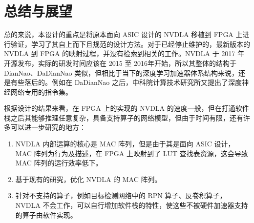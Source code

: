 \chapter{总结与展望}\label{chap:conclusion}

总的来说，本设计的重点是将原本面向 ASIC 设计的 NVDLA 移植到 FPGA 上进行验证，学习了其自上而下且规范的设计方法。对于已经停止维护的，最新版本的 NVDLA 到 FPGA 的映射过程，并没有检索到相关的工作。NVDLA 于 2017 年开源发布，实际的研发时间应该在 2015 至 2016年开始，所以其整体的结构于 DianNao、DaDianNao 类似，但相比于当下的深度学习加速器体系结构来说，还是有些落后的。例如在 DaDianNao 之后，中科院计算技术研究所又提出了深度神经网络专用的指令集。

根据设计的结果来看，在 FPGA 上的实现的 NVDLA 的速度一般，但在打通软件栈之后其能够推理任意复杂，具备支持算子的网络模型，但由于时间有限，还有许多可以进一步研究的地方：

\begin{enumerate}
    \item NVDLA 内部运算的核心是 MAC 阵列，但是由于其是面向 ASIC 设计，MAC 阵列为行为及描述，在 FPGA 上映射到了 LUT 查找表资源，这会导致 MAC 阵列的运行效率低下。
    \item 基于现有的研究\cite{祁琛2018应用于神经网络的高效能计算单元的研究与实现}，优化 NVDLA 的 MAC 阵列。
    \item 针对不支持的算子，例如目标检测网络中的 RPN 算子、反卷积算子，NVDLA 不会工作，可以自行增加软件栈的特性，使这些不被硬件加速器支持的算子由软件实现。
\end{enumerate}